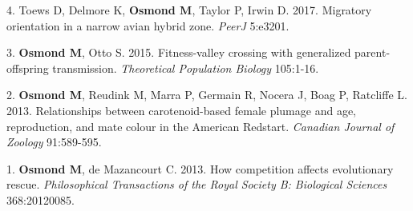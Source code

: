 \documentclass[12pt]{article}
\begin{document}
{\noindent\hspace{.1cm}4. Toews D, Delmore K, \textbf{Osmond M}, Taylor P, Irwin D. 2017. Migratory orientation in a narrow avian hybrid zone. \textit{PeerJ} 5:e3201.

\noindent\hspace{.1cm}3. \textbf{Osmond M}, Otto S. 2015. Fitness-valley crossing with generalized parent-offspring transmission. \textit{Theoretical Population Biology} 105:1-16. %

\noindent\hspace{.1cm}2. \textbf{Osmond M}, Reudink M, Marra P, Germain R, Nocera J,  Boag P, Ratcliffe L.  2013. Relationships between carotenoid-based female plumage and age, reproduction, and mate colour in the American Redstart. \textit{Canadian Journal of Zoology} 91:589-595. %

\noindent\hspace{.1cm}1. \textbf{Osmond M}, de Mazancourt C. 2013. How competition affects evolutionary rescue. \textit{Philosophical Transactions of the Royal Society B: Biological Sciences} 368:20120085. %

%


}
\end{document}

